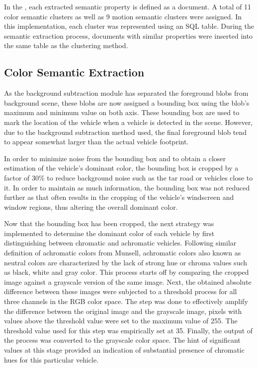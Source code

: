 In the \versionOne, each extracted semantic property is defined as a document. A total of 11 color semantic clusters as well as 9 motion semantic clusters were assigned. In this implementation, each cluster was represented using an SQL table. During the semantic extraction process, documents with similar properties were inserted into the same table as the clustering method. 


\subsection{Color Semantic Extraction }

As the background subtraction module has separated the foreground blobs from background scene, these blobs are now assigned a bounding box using the blob's maximum and minimum value on both axis. These bounding box are used to mark the location of the vehicle when a vehicle is detected in the scene. However, due to the background subtraction method used, the final foreground blob tend to appear somewhat larger than the actual vehicle footprint. 

In order to minimize noise from the bounding box and to obtain a closer estimation of the vehicle's dominant color, the bounding box is cropped by a factor of 30\% to reduce background noise such as the tar road or vehicles close to it. In order to maintain as much information, the bounding box was not reduced further as that often results in the cropping of the vehicle's windscreen and window regions, thus altering the overall dominant color.

Now that the bounding box has been cropped, the next strategy was implemented to determine the dominant color of each vehicle by first distinguishing between chromatic and achromatic vehicles. Following similar definition of achromatic colors from Munsell, achromatic colors also known as neutral colors are characterized by the lack of strong hue or chroma values such as black, white and gray color. This process starts off by comparing the cropped image against a grayscale version of the same image. Next, the obtained absolute difference between these images were subjected to a threshold process for all three channels in the RGB color space. The step was done to effectively amplify the difference between the original image and the grayscale image, pixels with values above the threshold value were set to the maximum value of 255. The threshold value used for this step was empirically set at 35. Finally, the output of the process was converted to the grayscale color space. The hint of significant values at this stage provided an indication of substantial presence of chromatic hues for this particular vehicle.     

